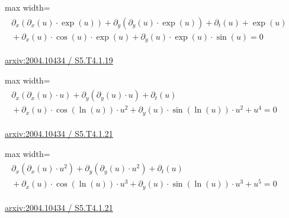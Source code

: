 \documentclass[UTF8,10pt,a4paper,fontset=mac]{ctexart}
\begin{document}
\begin{minipage}{\linewidth}\begin{center}\begin{adjustbox}{max width=\linewidth}$\displaystyle\begin{gathered}\begin{gathered}\partial_{x}(\partial_{x}(u)\cdot \exp(u))+\partial_{y}(\partial_{y}(u)\cdot \exp(u))+\partial_{t}(u)+\exp(u)\\[-1pt]{}+\partial_{x}(u)\cdot \cos(u)\cdot \exp(u)+\partial_{y}(u)\cdot \exp(u)\cdot \sin(u)=0\end{gathered}\end{gathered}$\end{adjustbox}\end{center}{\small\href{https://arxiv.org/html/2004.10434#S5.T4.1.19}{arxiv:2004.10434 / S5.T4.1.19}}\par\end{minipage}\par\vspace{6mm}

\begin{minipage}{\linewidth}\begin{center}\begin{adjustbox}{max width=\linewidth}$\displaystyle\begin{gathered}\begin{gathered}\partial_{x}(\partial_{x}(u)\cdot u)+\partial_{y}(\partial_{y}(u)\cdot u)+\partial_{t}(u)\\[-1pt]{}+\partial_{x}(u)\cdot \cos(\ln(u))\cdot u^{2}+\partial_{y}(u)\cdot \sin(\ln(u))\cdot u^{2}+u^{4}=0\end{gathered}\end{gathered}$\end{adjustbox}\end{center}{\small\href{https://arxiv.org/html/2004.10434#S5.T4.1.21}{arxiv:2004.10434 / S5.T4.1.21}}\par\end{minipage}\par\vspace{6mm}

\begin{minipage}{\linewidth}\begin{center}\begin{adjustbox}{max width=\linewidth}$\displaystyle\begin{gathered}\begin{gathered}\partial_{x}(\partial_{x}(u)\cdot u^{2})+\partial_{y}(\partial_{y}(u)\cdot u^{2})+\partial_{t}(u)\\[-1pt]{}+\partial_{x}(u)\cdot \cos(\ln(u))\cdot u^{3}+\partial_{y}(u)\cdot \sin(\ln(u))\cdot u^{3}+u^{5}=0\end{gathered}\end{gathered}$\end{adjustbox}\end{center}{\small\href{https://arxiv.org/html/2004.10434#S5.T4.1.21}{arxiv:2004.10434 / S5.T4.1.21}}\par\end{minipage}\par\vspace{6mm}
\end{document}
